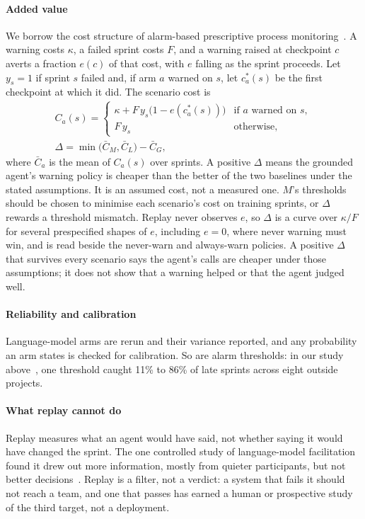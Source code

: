 \documentclass[conference]{IEEEtran}
\begin{document}
\paragraph{Added value} We borrow the cost structure of alarm-based prescriptive process monitoring~\cite{alarm}. A warning costs $\kappa$, a failed sprint costs $F$, and a warning raised at checkpoint $c$ averts a fraction $e(c)$ of that cost, with $e$ falling as the sprint proceeds. Let $y_s = 1$ if sprint $s$ failed and, if arm $a$ warned on $s$, let $c^{*}_a(s)$ be the first checkpoint at which it did. The scenario cost is
\begin{gather*}
C_a(s) = \begin{cases} \kappa + F\, y_s \big(1 - e(c^{*}_a(s))\big) & \text{if } a \text{ warned on } s,\\ F\, y_s & \text{otherwise,} \end{cases}\\
\Delta = \min\big(\bar{C}_M, \bar{C}_L\big) - \bar{C}_G ,
\end{gather*}
where $\bar{C}_a$ is the mean of $C_a(s)$ over sprints. A positive $\Delta$ means the grounded agent's warning policy is cheaper than the better of the two baselines under the stated assumptions. It is an assumed cost, not a measured one. $M$'s thresholds should be chosen to minimise each scenario's cost on training sprints, or $\Delta$ rewards a threshold mismatch. Replay never observes $e$, so $\Delta$ is a curve over $\kappa/F$ for several prespecified shapes of $e$, including $e = 0$, where never warning must win, and is read beside the never-warn and always-warn policies. A positive $\Delta$ that survives every scenario says the agent's calls are cheaper under those assumptions; it does not show that a warning helped or that the agent judged well.

\paragraph{Reliability and calibration} Language-model arms are rerun and their variance reported, and any probability an arm states is checked for calibration. So are alarm thresholds: in our study above~\cite{artifact}, one threshold caught 11\% to 86\% of late sprints across eight outside projects.

\paragraph{What replay cannot do} Replay measures what an agent would have said, not whether saying it would have changed the sprint. The one controlled study of language-model facilitation found it drew out more information, mostly from quieter participants, but not better decisions~\cite{alsobay}. Replay is a filter, not a verdict: a system that fails it should not reach a team, and one that passes has earned a human or prospective study of the third target, not a deployment.
\end{document}
